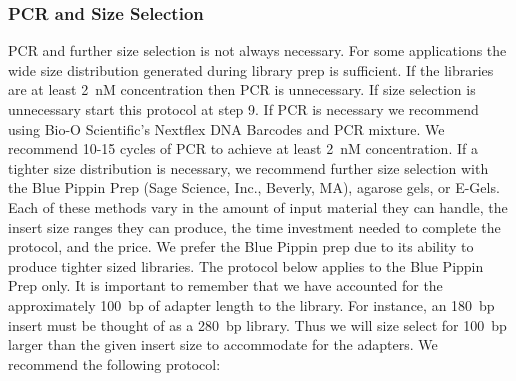 \documentclass[graybox]{svmult}
\begin{document}
\subsubsection{PCR and Size Selection}

PCR and further size selection is not always necessary. For some applications the wide size distribution generated during library prep is sufficient. If the libraries are at least 2~nM concentration then PCR is unnecessary. If size selection is unnecessary start this protocol at step 9. If PCR is necessary we recommend using Bio-O Scientific’s Nextflex DNA Barcodes and PCR mixture.  We recommend 10-15 cycles of PCR to achieve at least 2~nM concentration. If a tighter size distribution is necessary, we recommend further size selection with the Blue Pippin Prep (Sage Science, Inc., Beverly, MA), agarose gels, or E-Gels.  Each of these methods vary in the amount of input material they can handle, the insert size ranges they can produce, the time investment needed to complete the protocol, and the price. We prefer the Blue Pippin prep due to its ability to produce tighter sized libraries. The protocol below applies to the Blue Pippin Prep only. It is important to remember that we have accounted for the approximately 100~bp of adapter length to the library.  For instance, an 180~bp insert must be thought of as a 280~bp library. Thus we will size select for 100~bp larger than the given insert size to accommodate for the adapters.
We recommend the following protocol:
\end{document}
